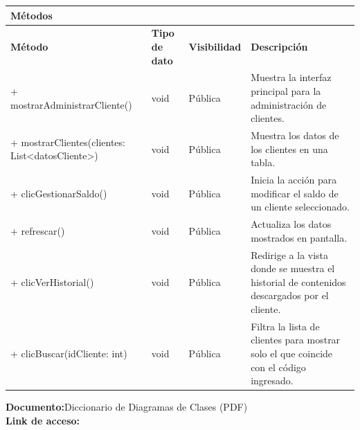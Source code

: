\begin{longtable}{|p{3.5cm}|p{2cm}|p{2cm}|p{6cm}|}
    \multicolumn{4}{|p{13.5cm}|}{\textbf{Métodos}} \\
    \hline
    \textbf{Método} & \textbf{Tipo de dato} & \textbf{Visibilidad} & \textbf{Descripción} \\
    \hline
    + mostrarAdministrarCliente() & void & Pública & Muestra la interfaz principal para la administración de clientes. \\
    \hline
    + mostrarClientes(clientes: List\textless datosCliente\textgreater) & void & Pública & Muestra los datos de los clientes en una tabla. \\
    \hline
    + clicGestionarSaldo() & void & Pública & Inicia la acción para modificar el saldo de un cliente seleccionado. \\
    \hline
    + refrescar() & void & Pública & Actualiza los datos mostrados en pantalla. \\
    \hline
    + clicVerHistorial() & void & Pública & Redirige a la vista donde se muestra el historial de contenidos descargados por el cliente. \\
    \hline
    + clicBuscar(idCliente: int) & void & Pública & Filtra la lista de clientes para mostrar solo el que coincide con el código ingresado. \\
    \hline
\end{longtable}

\textbf{Documento:}{Diccionario de Diagramas de Clases (PDF)} \\
\textbf{Link de acceso:} \linkDiccionarioClases \\


